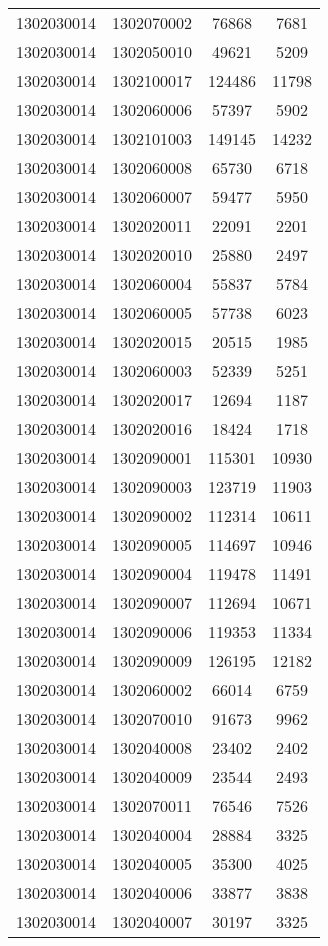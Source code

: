 \begin{longtable}{llcc}
1302030014 & 1302070002 & 76868 & 7681\\
1302030014 & 1302050010 & 49621 & 5209\\
1302030014 & 1302100017 & 124486 & 11798\\
1302030014 & 1302060006 & 57397 & 5902\\
1302030014 & 1302101003 & 149145 & 14232\\
1302030014 & 1302060008 & 65730 & 6718\\
1302030014 & 1302060007 & 59477 & 5950\\
1302030014 & 1302020011 & 22091 & 2201\\
1302030014 & 1302020010 & 25880 & 2497\\
1302030014 & 1302060004 & 55837 & 5784\\
1302030014 & 1302060005 & 57738 & 6023\\
1302030014 & 1302020015 & 20515 & 1985\\
1302030014 & 1302060003 & 52339 & 5251\\
1302030014 & 1302020017 & 12694 & 1187\\
1302030014 & 1302020016 & 18424 & 1718\\
1302030014 & 1302090001 & 115301 & 10930\\
1302030014 & 1302090003 & 123719 & 11903\\
1302030014 & 1302090002 & 112314 & 10611\\
1302030014 & 1302090005 & 114697 & 10946\\
1302030014 & 1302090004 & 119478 & 11491\\
1302030014 & 1302090007 & 112694 & 10671\\
1302030014 & 1302090006 & 119353 & 11334\\
1302030014 & 1302090009 & 126195 & 12182\\
1302030014 & 1302060002 & 66014 & 6759\\
1302030014 & 1302070010 & 91673 & 9962\\
1302030014 & 1302040008 & 23402 & 2402\\
1302030014 & 1302040009 & 23544 & 2493\\
1302030014 & 1302070011 & 76546 & 7526\\
1302030014 & 1302040004 & 28884 & 3325\\
1302030014 & 1302040005 & 35300 & 4025\\
1302030014 & 1302040006 & 33877 & 3838\\
1302030014 & 1302040007 & 30197 & 3325\\

\end{longtable}
